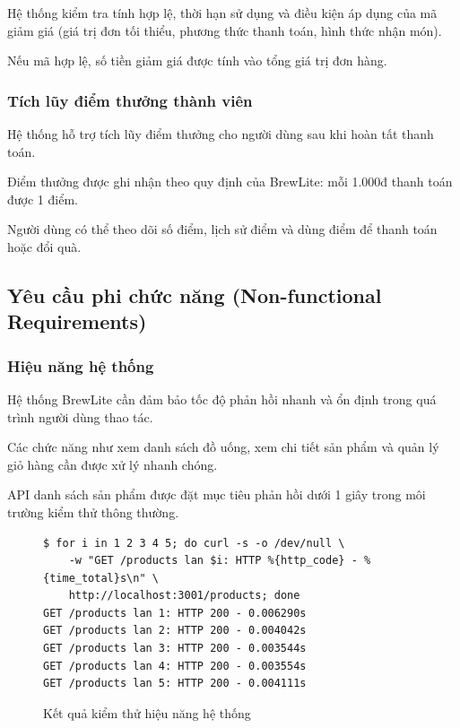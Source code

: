 \documentclass[12pt,a4paper]{article}
\begin{document}
Hệ thống kiểm tra tính hợp lệ, thời hạn sử dụng và điều kiện áp dụng của mã giảm giá (giá trị đơn tối thiểu, phương thức thanh toán, hình thức nhận món).

Nếu mã hợp lệ, số tiền giảm giá được tính vào tổng giá trị đơn hàng.

\subsubsection{Tích lũy điểm thưởng thành viên}
Hệ thống hỗ trợ tích lũy điểm thưởng cho người dùng sau khi hoàn tất thanh toán.

Điểm thưởng được ghi nhận theo quy định của BrewLite: mỗi 1.000đ thanh toán được 1 điểm.

Người dùng có thể theo dõi số điểm, lịch sử điểm và dùng điểm để thanh toán hoặc đổi quà.

\newpage
\subsection{Yêu cầu phi chức năng (Non-functional Requirements)}

\subsubsection{Hiệu năng hệ thống}
Hệ thống BrewLite cần đảm bảo tốc độ phản hồi nhanh và ổn định trong quá trình người dùng thao tác.

Các chức năng như xem danh sách đồ uống, xem chi tiết sản phẩm và quản lý giỏ hàng cần được xử lý nhanh chóng.

API danh sách sản phẩm được đặt mục tiêu phản hồi dưới 1 giây trong môi trường kiểm thử thông thường.

\begin{figure}[H]
\centering
\begin{terminal}[0.85\textwidth]
\begin{Verbatim}
$ for i in 1 2 3 4 5; do curl -s -o /dev/null \
    -w "GET /products lan $i: HTTP %{http_code} - %{time_total}s\n" \
    http://localhost:3001/products; done
GET /products lan 1: HTTP 200 - 0.006290s
GET /products lan 2: HTTP 200 - 0.004042s
GET /products lan 3: HTTP 200 - 0.003544s
GET /products lan 4: HTTP 200 - 0.003554s
GET /products lan 5: HTTP 200 - 0.004111s
\end{Verbatim}
\end{terminal}
\caption{Kết quả kiểm thử hiệu năng hệ thống}
\end{figure}
\end{document}
